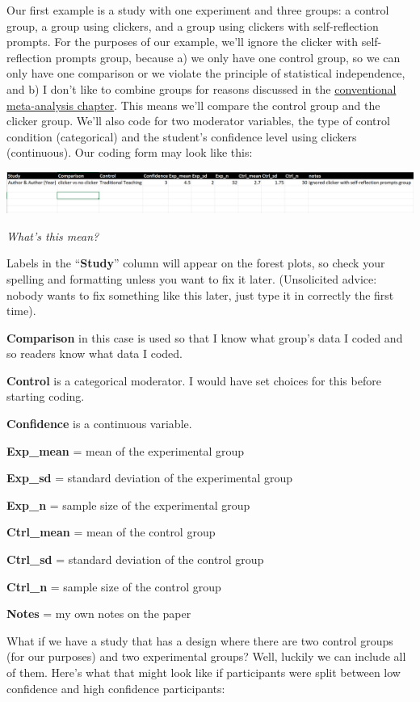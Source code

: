\documentclass[
]{book}
\begin{document}
Our first example is a study with one experiment and three groups: a control group, a group using clickers, and a group using clickers with self-reflection prompts. For the purposes of our example, we'll ignore the clicker with self-reflection prompts group, because a) we only have one control group, so we can only have one comparison or we violate the principle of statistical independence, and b) I don't like to combine groups for reasons discussed in the \protect\hyperlink{meta}{conventional meta-analysis chapter}. This means we'll compare the control group and the clicker group. We'll also code for two moderator variables, the type of control condition (categorical) and the student's confidence level using clickers (continuous). Our coding form may look like this:

\includegraphics[width=2\textwidth,height=\textheight]{images/MA_coding.PNG}

\emph{What's this mean?}

Labels in the ``\textbf{Study}'' column will appear on the forest plots, so check your spelling and formatting unless you want to fix it later. (Unsolicited advice: nobody wants to fix something like this later, just type it in correctly the first time).

\textbf{Comparison} in this case is used so that I know what group's data I coded and so readers know what data I coded.

\textbf{Control} is a categorical moderator. I would have set choices for this before starting coding.

\textbf{Confidence} is a continuous variable.

\textbf{Exp\_mean} = mean of the experimental group

\textbf{Exp\_sd} = standard deviation of the experimental group

\textbf{Exp\_n} = sample size of the experimental group

\textbf{Ctrl\_mean} = mean of the control group

\textbf{Ctrl\_sd} = standard deviation of the control group

\textbf{Ctrl\_n} = sample size of the control group

\textbf{Notes} = my own notes on the paper

What if we have a study that has a design where there are two control groups (for our purposes) and two experimental groups? Well, luckily we can include all of them. Here's what that might look like if participants were split between low confidence and high confidence participants:
\end{document}
